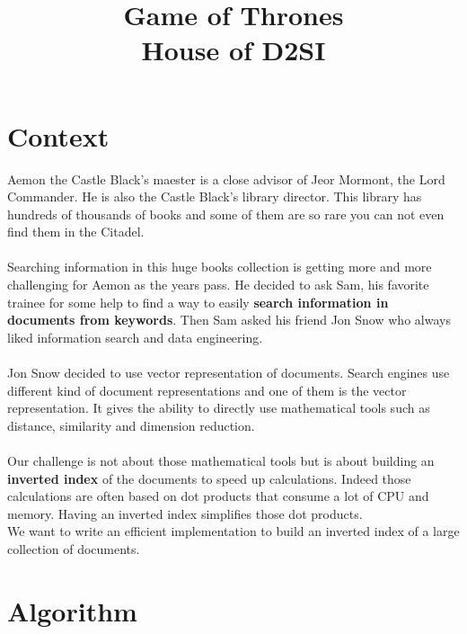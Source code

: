 \documentclass[12pt,french,titlepage]{article}
\title{\textbf{Game of Thrones} \\ House of D2SI}
\date{\vspace{-35ex}}
\begin{document}
\maketitle

\section{Context}
Aemon the Castle Black's maester is a close advisor of Jeor Mormont, the Lord Commander. He is also the Castle Black's library director. This library has hundreds of thousands of books and some of them are so rare you can not even find them in the Citadel. 
\\\\
Searching information in this huge books collection is getting more and more challenging for Aemon as the years pass. He decided to ask Sam, his favorite trainee for some help to find a way to easily \textbf{search information in documents from keywords}. Then Sam asked his friend Jon Snow who always liked information search and data engineering.
\\\\
Jon Snow decided to use vector representation of documents. Search engines use different kind of document representations and one of them is the vector representation. It gives the ability to directly use mathematical tools such as distance, similarity and dimension reduction.
\\\\
Our challenge is not about those mathematical tools but is about building an \textbf{inverted index} of the documents to speed up calculations. Indeed those calculations are often based on dot products that consume a lot of CPU and memory. Having an inverted index simplifies those dot products.
\\
We want to write an efficient implementation to build an inverted index of a large collection of documents.

\section{Algorithm}
\end{document}
